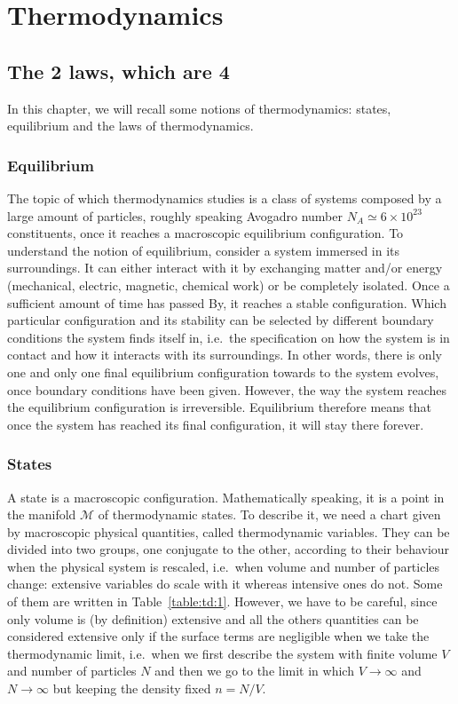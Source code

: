 \part{Thermodynamics}

\chapter{The 2 laws, which are 4}

    In this chapter, we will recall some notions of thermodynamics: states, equilibrium and the laws of thermodynamics.

\section{Equilibrium}

    The topic of which thermodynamics studies is a class of systems composed by a large amount of particles, roughly speaking Avogadro number $N_A \simeq 6 \times 10^{23}$ constituents, once it reaches a macroscopic equilibrium configuration. To understand the notion of equilibrium, consider a system immersed in its surroundings. It can either interact with it by exchanging matter and/or energy (mechanical, electric, magnetic, chemical work) or be completely isolated. Once a sufficient amount of time has passed By, it reaches a stable configuration. Which particular configuration and its stability can be selected by different boundary conditions the system finds itself in, i.e.~the specification on how the system is in contact and how it interacts with its surroundings. In other words, there is only one and only one final equilibrium configuration towards to the system evolves, once boundary conditions have been given. However, the way the system reaches the equilibrium configuration is irreversible. Equilibrium therefore means that once the system has reached its final configuration, it will stay there forever. 

\section{States}

    A state is a macroscopic configuration. Mathematically speaking, it is a point in the manifold $\mathcal M$ of thermodynamic states. To describe it, we need a chart given by macroscopic physical quantities, called thermodynamic variables. They can be divided into two groups, one conjugate to the other, according to their behaviour when the physical system is rescaled, i.e.~when volume and number of particles change: extensive variables do scale with it whereas intensive ones do not. Some of them are written in Table~\ref{table:td:1}. However, we have to be careful, since only volume is (by definition) extensive and all the others quantities can be considered extensive only if the surface terms are negligible when we take the thermodynamic limit, i.e.~when we first describe the system with finite volume $V$ and number of particles $N$ and then we go to the limit in which $V \rightarrow \infty$ and $N \rightarrow \infty$ but keeping the density fixed $n = N / V$.

